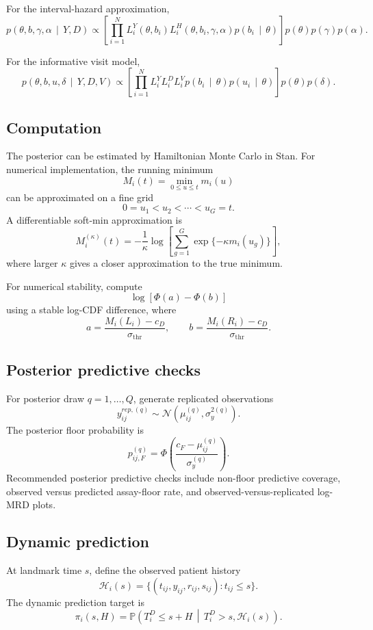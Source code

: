 \documentclass[11pt]{article}
\theoremstyle{remark}
\newcommand{\Normal}{\mathcal{N}}
\newcommand{\Prob}{\mathbb{P}}
\newcommand{\given}{\,\middle|\,}
\newcommand{\PhiStd}{\Phi}
\begin{document}
For the interval-hazard approximation,
\[
p(\theta,b,\gamma,\alpha\given Y,D)
\propto
\left[
\prod_{i=1}^{N}
L_i^Y(\theta,b_i)
L_i^H(\theta,b_i,\gamma,\alpha)
p(b_i\given\theta)
\right]
p(\theta)p(\gamma)p(\alpha).
\]

For the informative visit model,
\[
p(\theta,b,u,\delta\given Y,D,V)
\propto
\left[
\prod_{i=1}^{N}
L_i^Y
L_i^D
L_i^V
p(b_i\given\theta)
p(u_i\given\theta)
\right]
p(\theta)p(\delta).
\]

\subsection{Computation}

The posterior can be estimated by Hamiltonian Monte Carlo in Stan. For numerical implementation, the running minimum
\[
M_i(t)=\min_{0\leq u\leq t}m_i(u)
\]
can be approximated on a fine grid
\[
0=u_1<u_2<\cdots<u_G=t.
\]
A differentiable soft-min approximation is
\[
M_i^{(\kappa)}(t)
=
-\frac{1}{\kappa}
\log
\left[
\sum_{g=1}^{G}
\exp\{-\kappa m_i(u_g)\}
\right],
\]
where larger \(\kappa\) gives a closer approximation to the true minimum.

For numerical stability, compute
\[
\log\left[\PhiStd(a)-\PhiStd(b)\right]
\]
using a stable log-CDF difference, where
\[
a=\frac{M_i(L_i)-c_D}{\sigma_{\mathrm{thr}}},
\qquad
b=\frac{M_i(R_i)-c_D}{\sigma_{\mathrm{thr}}}.
\]

\subsection{Posterior predictive checks}

For posterior draw \(q=1,\ldots,Q\), generate replicated observations
\[
y_{ij}^{rep,(q)}
\sim
\Normal(\mu_{ij}^{(q)},\sigma_y^{2(q)}).
\]
The posterior floor probability is
\[
p_{ij,F}^{(q)}
=
\PhiStd
\left(
\frac{c_F-\mu_{ij}^{(q)}}{\sigma_y^{(q)}}
\right).
\]
Recommended posterior predictive checks include non-floor predictive coverage, observed versus predicted assay-floor rate, and observed-versus-replicated log-MRD plots.

\subsection{Dynamic prediction}

At landmark time \(s\), define the observed patient history
\[
\mathcal{H}_i(s)
=
\{(t_{ij},y_{ij},r_{ij},s_{ij}):t_{ij}\leq s\}.
\]
The dynamic prediction target is
\[
\pi_i(s,H)
=
\Prob(T_i^D\leq s+H\given T_i^D>s,\mathcal{H}_i(s)).
\]
\end{document}
